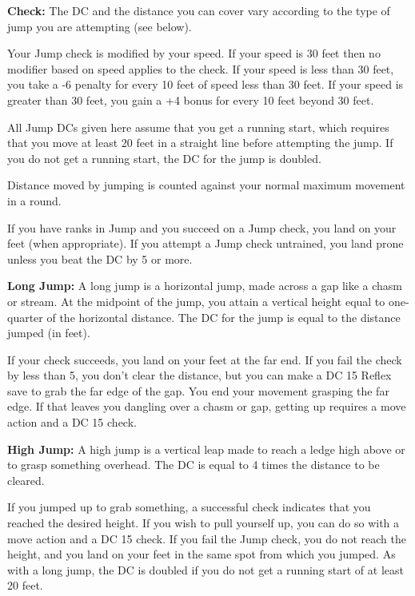 
\textbf{Check:} The DC and the distance you can cover vary according to the type of jump you are attempting (see below).

Your Jump check is modified by your speed. If your speed is 30 feet then no modifier based on speed applies to the check. If your speed is less than 30 feet, you take a -6 penalty for every 10 feet of speed less than 30 feet. If your speed is greater than 30 feet, you gain a +4 bonus for every 10 feet beyond 30 feet.

All Jump DCs given here assume that you get a running start, which requires that you move at least 20 feet in a straight line before attempting the jump. If you do not get a running start, the DC for the jump is doubled.

Distance moved by jumping is counted against your normal maximum movement in a round.

If you have ranks in Jump and you succeed on a Jump check, you land on your feet (when appropriate). If you attempt a Jump check untrained, you land prone unless you beat the DC by 5 or more.

\textbf{Long Jump:} A long jump is a horizontal jump, made across a gap like a chasm or stream. At the midpoint of the jump, you attain a vertical height equal to one-quarter of the horizontal distance. The DC for the jump is equal to the distance jumped (in feet).

If your check succeeds, you land on your feet at the far end. If you fail the check by less than 5, you don't clear the distance, but you can make a DC 15 Reflex save to grab the far edge of the gap. You end your movement grasping the far edge. If that leaves you dangling over a chasm or gap, getting up requires a move action and a DC 15  check.

\textbf{High Jump:} A high jump is a vertical leap made to reach a ledge high above or to grasp something overhead. The DC is equal to 4 times the distance to be cleared.

If you jumped up to grab something, a successful check indicates that you reached the desired height. If you wish to pull yourself up, you can do so with a move action and a DC 15  check. If you fail the Jump check, you do not reach the height, and you land on your feet in the same spot from which you jumped. As with a long jump, the DC is doubled if you do not get a running start of at least 20 feet.


